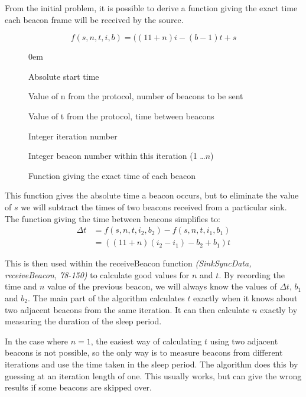 \documentclass[a4paper,12pt,draft,DIV=calc]{scrartcl}
\newcommand{\coderef}[3]{\emph{(#1, #2, #3)}}
\begin{document}
From the initial problem, it is possible to derive a function giving the exact
time each beacon frame will be received by the source.

\begin{figure}[ht]
  \begin{mdframed}
  \centering
    \begin{equation*}
      f(s, n, t, i, b) = ((11 + n)i - (b - 1)t + s
    \end{equation*}
    \begin{description}
      \itemsep0em
      \item[$s$] Absolute start time
      \item[$n$] Value of n from the protocol, number of beacons to be sent
      \item[$t$] Value of t from the protocol, time between beacons
      \item[$i$] Integer iteration number
      \item[$b$] Integer beacon number within this iteration (1 \dots $n$)
    \end{description}
  \end{mdframed}
  \caption{Function giving the exact time of each beacon}
\end{figure}

This function gives the absolute time a beacon occurs, but to eliminate the
value of $s$ we will subtract the times of two beacons received from a
particular sink. The function giving the time between beacons simplifies to:
\begin{align*}
  \Delta t &= f(s, n, t, i_2, b_2) - f(s, n, t, i_1, b_1) \\
           &= ((11 + n)(i_2 - i_1) - b_2 + b_1)t
\end{align*}

This is then used within the receiveBeacon function \coderef{SinkSyncData}
{receiveBeacon}{78-150} to calculate good values for $n$ and $t$. By recording
the time and $n$ value of the previous beacon, we will always know the values
of $\Delta t$, $b_1$ and $b_2$. The main part of the
algorithm calculates $t$ exactly when it knows about two adjacent beacons from
the same iteration. It can then calculate $n$ exactly by measuring the duration
of the sleep period.

In the case where $n = 1$, the easiest way of calculating $t$ using two adjacent
beacons is not possible, so the only way is to measure beacons from different
iterations and use the time taken in the sleep period. The algorithm does this
by guessing at an iteration length of one. This usually works, but can give the
wrong results if some beacons are skipped over.
\end{document}
